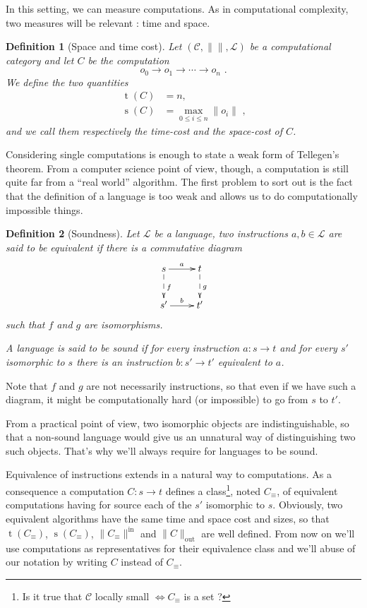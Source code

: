 \documentclass{article}
\newcommand{\cat}[1]{\mathscr{#1}}
\newcommand{\C}{\cat{C}}
\renewcommand{\L}{\cat{L}}
\newcommand{\size}[1]{\lVert#1\rVert}
\newcommand{\sizein}[1]{\size{#1}^\mathrm{in}}
\newcommand{\sizeout}[1]{\size{#1}_\mathrm{out}}
\newcommand{\ra}{\rightarrow}
\DeclareMathOperator{\Time}{t}
\DeclareMathOperator{\Space}{s}
\newtheorem{definition}{Definition}
\begin{document}
  In this setting, we can measure computations. As in computational
  complexity, two measures will be relevant : time and space.

  \begin{definition}[Space and time cost]
    Let $(\C, \size{}, \L)$ be a computational category and let $C$ be
    the computation
    \[o_0 \ra o_1 \ra \cdots \ra o_n \text{ .}\]
    We define the two quantities
    \begin{align*}
      \Time(C) &= n \text{,} \\
      \Space(C) &= \max_{0\le i \le n} \size{o_i} \text{ ,}
    \end{align*}
    and we call them respectively the \emph{time-cost} and the
    \emph{space-cost} of $C$.
  \end{definition}

  Considering single computations is enough to state a weak form of
  Tellegen's theorem. From a computer science point of view, though, a
  computation is still quite far from a ``real world'' algorithm. The
  first problem to sort out is the fact that the definition of a
  language is too weak and allows us to do computationally impossible
  things.
  
  \begin{definition}[Soundness]
    Let $\L$ be a language, two instructions $a,b\in\L$ are said to be
    \emph{equivalent} if there is a commutative diagram
    \[\xymatrix{
      s \ar[r]^a \ar@{-->}[d]^f & t \ar@{-->}[d]^g\\
      s' \ar[r]^b & t'
    }\]
    such that $f$ and $g$ are isomorphisms.

    A language is said to be \emph{sound} if for every instruction
    $a:s\ra t$ and for every $s'$ isomorphic to $s$ there is an
    instruction $b:s'\ra t'$ equivalent to $a$.
  \end{definition}

  Note that $f$ and $g$ are not necessarily instructions, so that even
  if we have such a diagram, it might be computationally hard (or
  impossible) to go from $s$ to $t'$.

  From a practical point of view, two isomorphic objects are
  indistinguishable, so that a non-sound language would give us an
  unnatural way of distinguishing two such objects. That's why we'll
  always require for languages to be sound.

  Equivalence of instructions extends in a natural way to
  computations. As a consequence a computation $C:s\ra t$ defines a
  class\footnote{Is it true that $\C$ locally small $\Leftrightarrow
  C_\equiv$ is a set ?}, noted $C_\equiv$, of equivalent computations
  having for source each of the $s'$ isomorphic to $s$. Obviously, two
  equivalent algorithms have the same time and space cost and sizes,
  so that $\Time(C_\equiv)$, $\Space(C_\equiv)$, $\sizein{C_\equiv}$
  and $\sizeout{C}$ are well defined. From now on we'll use
  computations as representatives for their equivalence class and
  we'll abuse of our notation by writing $C$ instead of $C_\equiv$.
  
\end{document}
